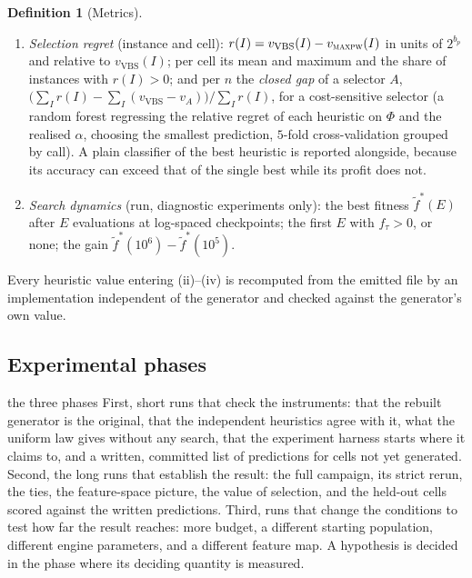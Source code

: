 \documentclass[a4paper,11pt]{article}
\newcommand{\bp}{b_{p}}
\newcommand{\MAXPW}{\textsc{maxpw}}
\theoremstyle{plain}
\theoremstyle{definition}
\newtheorem{definition}{Definition}
\theoremstyle{remark}
\begin{document}
\begin{definition}[Metrics]
\begin{enumerate}[leftmargin=1.8em,itemsep=2pt]
by heuristic and by side, and the variance explained by the first two principal components.
Types with fewer than $5$ instances in a subset are dropped from that subset's summaries.
\item \emph{Selection regret} (instance and cell): $r(I)=v_{\mathrm{VBS}}(I)-v_{\MAXPW}(I)$
in units of $2^{\bp}$ and relative to $v_{\mathrm{VBS}}(I)$; per cell its mean and maximum and
the share of instances with $r(I)>0$; and per $n$ the \emph{closed gap} of a selector $A$,
$\bigl(\sum_I r(I)-\sum_I(v_{\mathrm{VBS}}-v_A)\bigr)/\sum_I r(I)$, for a cost-sensitive
selector (a random forest regressing the relative regret of each heuristic on $\Phi$ and the
realised $\alpha$, choosing the smallest prediction, $5$-fold cross-validation grouped by
call). A plain classifier of the best heuristic is reported alongside, because its accuracy
can exceed that of the single best while its profit does not.
\item \emph{Search dynamics} (run, diagnostic experiments only): the best fitness
$\tilde f^{*}(E)$ after $E$ evaluations at log-spaced checkpoints; the first $E$ with
$f_\tau>0$, or none; the gain $\tilde f^{*}(10^{6})-\tilde f^{*}(10^{5})$.
\end{enumerate}
Every heuristic value entering (ii)--(iv) is recomputed from the emitted file by an
implementation independent of the generator and checked against the generator's own value.
\end{definition}

\subsection{Experimental phases}\label{sec:phases}

\begin{plain}{the three phases}
First, short runs that check the instruments: that the rebuilt generator is the original,
that the independent heuristics agree with it, what the uniform law gives without any
search, that the experiment harness starts where it claims to, and a written, committed list
of predictions for cells not yet generated. Second, the long runs that establish the result:
the full campaign, its strict rerun, the ties, the feature-space picture, the value of
selection, and the held-out cells scored against the written predictions. Third, runs that
change the conditions to test how far the result reaches: more budget, a different starting
population, different engine parameters, and a different feature map. A hypothesis is
decided in the phase where its deciding quantity is measured.
\end{plain}
\end{document}
